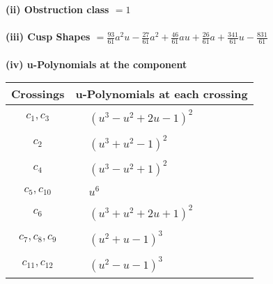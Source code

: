 \documentclass[1p]{elsarticle_modified}
\theoremstyle{definition}
\begin{document}
\flushleft \textbf{(ii) Obstruction class $= 1$}\\~\\
\flushleft \textbf{(iii) Cusp Shapes $= \frac{93}{61} a^2 u-\frac{27}{61} a^2+\frac{46}{61} a u+\frac{26}{61} a+\frac{341}{61} u-\frac{831}{61}$}\\~\\
\newpage\renewcommand{\arraystretch}{1}
\flushleft \textbf{(iv) u-Polynomials at the component}\newline \\
\begin{tabular}{m{50pt}|m{274pt}}
Crossings & \hspace{64pt}u-Polynomials at each crossing \\
\hline $$\begin{aligned}c_{1},c_{3}\end{aligned}$$&$\begin{aligned}
&(u^3- u^2+2 u-1)^2
\end{aligned}$\\
\hline $$\begin{aligned}c_{2}\end{aligned}$$&$\begin{aligned}
&(u^3+u^2-1)^2
\end{aligned}$\\
\hline $$\begin{aligned}c_{4}\end{aligned}$$&$\begin{aligned}
&(u^3- u^2+1)^2
\end{aligned}$\\
\hline $$\begin{aligned}c_{5},c_{10}\end{aligned}$$&$\begin{aligned}
&u^6
\end{aligned}$\\
\hline $$\begin{aligned}c_{6}\end{aligned}$$&$\begin{aligned}
&(u^3+u^2+2 u+1)^2
\end{aligned}$\\
\hline $$\begin{aligned}c_{7},c_{8},c_{9}\end{aligned}$$&$\begin{aligned}
&(u^2+u-1)^3
\end{aligned}$\\
\hline $$\begin{aligned}c_{11},c_{12}\end{aligned}$$&$\begin{aligned}
&(u^2- u-1)^3
\end{aligned}$\\
\hline
\end{tabular}\\~\\
\end{document}
